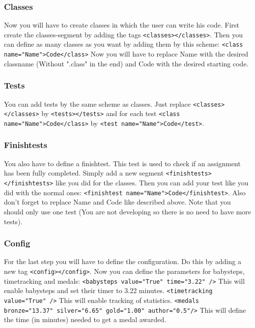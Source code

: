 \documentclass[10pt,a4paper]{article}
\begin{document}
\subsubsection{Classes}
Now you will have to create classes in which the user can write his code. First create the classes-segment by adding the tags \texttt{<classes></classes>}. \newline
Then you can define as many classes as you want by adding them by this scheme: \newline
\texttt{<class name="Name">Code</class>} Now you will have to replace Name with the desired classname (Without ".class" in the end) and Code with the desired starting code.
\subsubsection{Tests}
You can add tests by the same scheme as classes. Just replace \texttt{<classes></classes>} by \texttt{<tests></tests>} and for each test \texttt{<class name="Name">Code</class>} by \texttt{<test name="Name">Code</test>}.
\subsubsection{Finishtests}
You also have to define a finishtest. This test is used to check if an assignment has been fully completed. Simply add a new segment \texttt{<finishtests></finishtests>} like you did for the classes. Then you can add your test like you did with the normal ones: \texttt{<finishtest name="Name">Code</finishtest>}. Also don't forget to replace Name and Code like described above. Note that you should only use one test (You are not developing so there is no need to have more tests).
\subsubsection{Config}
For the last step you will have to define the configuration. Do this by adding a new tag  \texttt{<config></config>}. \newline
Now you can define the parameters for babysteps, timetracking and medals: \newline\newline
\texttt{<babysteps value="True" time="3.22" />} This will enable babysteps and set their timer to 3.22 minutes. \newline\newline
\texttt{<timetracking value="True" />} This will enable tracking of statistics. \newline\newline
\texttt{<medals bronze="13.37" silver="6.65" gold="1.00" author="0.5"/>} This will define the time (in minutes) needed to get a medal awarded. 
\end{document}
